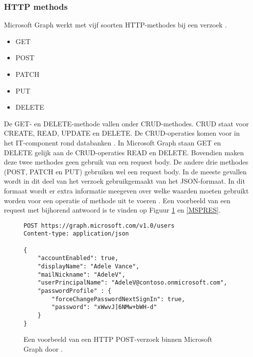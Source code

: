 \begin{comment}
Wanneer er een verzoek wordt verstuurd, krijgt dit ook een antwoord terug. Een antwoord bestaat uit minstens volgende onderdelen: 

\begin{itemize}
    \item Status code:
    \item Response message:
    \item @odata.nextLink:
\end{itemize}
\end{comment}

\subsubsection{HTTP methods}

Microsoft Graph werkt met vijf soorten \Ac{HTTP}-methodes bij een verzoek \autocite{Microsoft2023vv}.

\begin{itemize}
    \item GET
    \item POST
    \item PATCH
    \item PUT
    \item DELETE
\end{itemize}

De GET- en DELETE-methode vallen onder CRUD-methodes. CRUD staat voor CREATE, READ, UPDATE en DELETE. De CRUD-operaties komen voor in het \ac{IT}-component rond databanken \autocite{Truica2015}. In Microsoft Graph staan GET en DELETE gelijk aan de CRUD-operaties READ en DELETE. Bovendien maken deze twee methodes geen gebruik van een request body. De andere drie methodes (POST, PATCH en PUT) gebruiken wel een request body. In de meeste gevallen wordt in dit deel van het verzoek gebruikgemaakt van het \ac{JSON}-formaat. In dit formaat wordt er extra informatie meegeven over welke waarden moeten gebruikt worden voor een operatie of methode uit te voeren \autocite{Microsoft2023vv}. Een voorbeeld van een request met bijhorend antwoord is te vinden op Figuur \ref{MSPR} en \ref{MSPRES}. \\

\begin{figure}[h]
    \scriptsize
    \begin{verbatim}
POST https://graph.microsoft.com/v1.0/users
Content-type: application/json

{
    "accountEnabled": true,
    "displayName": "Adele Vance",
    "mailNickname": "AdeleV",
    "userPrincipalName": "AdeleV@contoso.onmicrosoft.com",
    "passwordProfile" : {
        "forceChangePasswordNextSignIn": true,
        "password": "xWwvJ]6NMw+bWH-d"
    }
}
    \end{verbatim}    
    \caption[Voorbeeld Microsoft Graph POST-verzoek]{Een voorbeeld van een \ac{HTTP} POST-verzoek binnen Microsoft Graph door \textcite{Microsoft2022e}.}
    \label{MSPR}
\end{figure}

